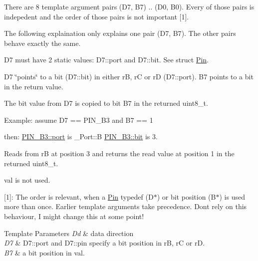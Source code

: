 There are 8 template argument pairs ({\ttfamily D7}, {\ttfamily B7}) .. ({\ttfamily D0}, {\ttfamily B0}). Every of those pairs is indepedent and the order of those pairs is not important \mbox{[}1\mbox{]}.

The following explaination only explains one pair ({\ttfamily D7}, {\ttfamily B7}). The other pairs behave exactly the same.

{\ttfamily D7} must have 2 static values\+: {\ttfamily D7\+::port} and {\ttfamily D7\+::bit}. See struct \hyperlink{structports_1_1Pin}{Pin}.

{\ttfamily D7} \char`\"{}points\char`\"{} to a bit ({\ttfamily D7\+::bit}) in either {\ttfamily rB}, {\ttfamily rC} or {\ttfamily rD} ({\ttfamily D7\+::port}). {\ttfamily B7} points to a bit in the return value.

The bit value from {\ttfamily D7} is copied to bit {\ttfamily B7} in the returned {\ttfamily uint8\+\_\+t}.

Example\+: assume {\ttfamily D7 == P\+I\+N\+\_\+\+B3} and {\ttfamily B7 == 1}

then\+: {\ttfamily \hyperlink{structports_1_1Pin_ad63613b8c14441d28e3f3d935da67e77}{P\+I\+N\+\_\+\+B3\+::port}} is {\ttfamily \+\_\+\+Port\+::B} {\ttfamily \hyperlink{structports_1_1Pin_aea726b85cfe5e49822dd2517da5c860f}{P\+I\+N\+\_\+\+B3\+::bit}} is 3.

Reads from {\ttfamily rB} at position 3 and returns the read value at position 1 in the returned {\ttfamily uint8\+\_\+t}.

{\ttfamily val} is not used.

\mbox{[}1\mbox{]}\+: The order is relevant, when a \hyperlink{structports_1_1Pin}{Pin} {\ttfamily typedef} (D$\ast$) or bit position (B$\ast$) is used more than once. Earlier template arguments take precedence. Don\textquotesingle{}t rely on this behaviour, I might change this at some point!


\begin{DoxyTemplParams}{Template Parameters}
{\em Dd} & data direction \\
\hline
{\em D7} & {\ttfamily D7\+::port} and {\ttfamily D7\+::pin} specify a bit position in {\ttfamily rB}, {\ttfamily rC} or {\ttfamily rD}. \\
\hline
{\em B7} & a bit position in {\ttfamily val}. \\
\hline
\end{DoxyTemplParams}
